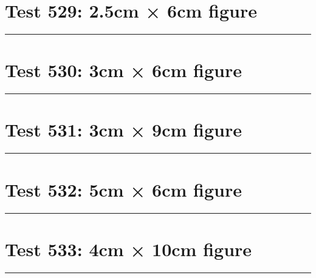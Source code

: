 \documentclass[a4paper,11pt]{article}
\begin{document}
\section*{Test 529: 2.5cm × 6cm figure}
\begin{swarmwrap}%
  \begin{minipage}[t]{2cm}
    \centering
    \rule{\linewidth}{6cm}
  \end{minipage}%
\end{swarmwrap}%
\swarmwrapnext
\lipsum[59]
\lipsum[60]
\lipsum[61]
\lipsum[62]
\lipsum[63]
\section*{Test 530: 3cm × 6cm figure}
\begin{swarmwrap}%
  \begin{minipage}[t]{3cm}
    \centering
    \rule{\linewidth}{6cm}
  \end{minipage}%
\end{swarmwrap}%
\swarmwrapnext
\lipsum[127]
\lipsum[128]
\lipsum[129]
\lipsum[130]
\section*{Test 531: 3cm × 9cm figure}
\begin{swarmwrap}%
  \begin{minipage}[t]{3cm}
    \centering
    \rule{\linewidth}{9cm}
  \end{minipage}%
\end{swarmwrap}%
\swarmwrapnext
\lipsum[145]
\lipsum[146]
\lipsum[147]
\lipsum[148]
\lipsum[149]
\section*{Test 532: 5cm × 6cm figure}
\begin{swarmwrap}%
  \begin{minipage}[t]{5cm}
    \centering
    \rule{\linewidth}{6cm}
  \end{minipage}%
\end{swarmwrap}%
\swarmwrapnext
\lipsum[33]
\lipsum[34]
\lipsum[35]
\lipsum[36]
\lipsum[37]
\section*{Test 533: 4cm × 10cm figure}
\begin{swarmwrap}%
  \begin{minipage}[t]{4cm}
    \centering
    \rule{\linewidth}{10cm}
  \end{minipage}%
\end{swarmwrap}%
\swarmwrapnext
\lipsum[103]
\lipsum[104]
\lipsum[105]
\lipsum[106]
\lipsum[107]
\lipsum[108]
\end{document}
